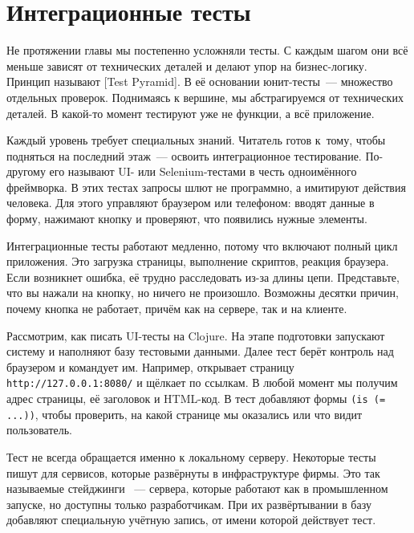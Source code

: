 \section{Интеграционные тесты}


Не протяжении главы мы постепенно усложняли тесты. С каждым шагом они всё меньше
зависят от технических деталей и делают упор на бизнес-логику. Принцип называют
[Test Pyramid].
В её основании юнит-тесты~--- множество отдельных проверок. Поднимаясь к
вершине, мы абстрагируемся от технических деталей. В какой-то момент тестируют
уже не функции, а всё приложение.


Каждый уровень требует специальных знаний. Читатель готов к~тому, чтобы
подняться на последний этаж~--- освоить интеграционное тестирование. По-другому
его называют UI- или Selenium-тестами в честь одноимённого фреймворка. В этих
тестах запросы шлют не программно, а имитируют действия человека. Для этого
управляют браузером или телефоном: вводят данные в форму, нажимают кнопку и
проверяют, что появились нужные элементы.

Интеграционные тесты работают медленно, потому что включают полный цикл
приложения. Это загрузка страницы, выполнение скриптов, реакция браузера. Если
возникнет ошибка, её трудно расследовать из-за длины цепи. Представьте, что вы
нажали на кнопку, но ничего не произошло. Возможны десятки причин, почему кнопка
не работает, причём как на сервере, так и на клиенте.

Рассмотрим, как писать UI-тесты на Clojure. На этапе подготовки запускают
систему и наполняют базу тестовыми данными. Далее тест берёт контроль над
браузером и командует им. Например, открывает страницу \verb|http://127.0.0.1:8080/|
и щёлкает по ссылкам. В любой момент мы получим адрес страницы, её заголовок
и HTML-код. В тест добавляют формы \verb|(is (= ...))|, чтобы проверить,
на какой странице мы оказались или что видит пользователь.

Тест не всегда обращается именно к локальному серверу. Некоторые тесты пишут для
сервисов, которые развёрнуты в инфраструктуре фирмы. Это так называемые
стейджинги ~--- сервера, которые работают как в промышленном
запуске, но доступны только разработчикам. При их развёртывании в базу добавляют
специальную учётную запись, от имени которой действует тест.

